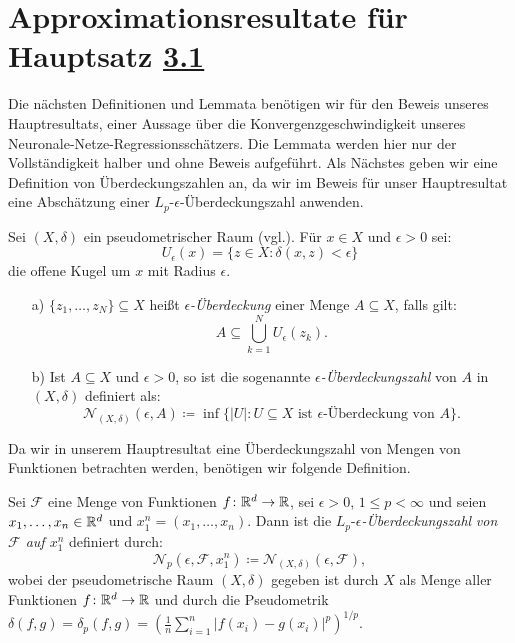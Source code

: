 \section{Approximationsresultate für Hauptsatz \hyperref[optstop]{3.1}}
Die nächsten  Definitionen und Lemmata benötigen wir für den Beweis unseres Hauptresultats, einer Aussage über die Konvergenzgeschwindigkeit unseres Neuronale-Netze-Regressionsschätzers. Die Lemmata werden hier nur der Vollständigkeit halber und ohne Beweis aufgeführt. 
Als Nächstes geben wir eine Definition von Überdeckungszahlen an, da wir im Beweis für unser Hauptresultat eine Abschätzung einer $L_p\text{-}\epsilon$-Überdeckungszahl anwenden.
\begin{defn}
\label{ueberdeckung}
Sei $(X, \delta)$ ein pseudometrischer Raum (vgl.\@ \cite[Definition~2.1.1]{Topologie2015}). Für $x \in X$ und $\epsilon > 0$ sei:
$$U_{\epsilon}(x) = \{z \in X : \delta(x, z) < \epsilon\}$$
die offene Kugel um $x$ mit Radius $\epsilon$.
\begin{itemize}
\item[a)] $\{z_1,\dots,z_N\} \subseteq X$ heißt $\epsilon$\textit{-Überdeckung} einer Menge $A \subseteq X$, falls gilt:
$$A \subseteq \bigcup_{k = 1}^N U_{\epsilon}(z_k).$$
\item[b)] Ist $A \subseteq X$ und $\epsilon > 0$, so ist die sogenannte $\epsilon$\textit{-Überdeckungszahl} von $A$ in $(X,\delta)$ definiert als:
$$\mathcal{N}_{(X,\delta)}(\epsilon, A) \coloneqq \inf\big\{|U| : U \subseteq X \text{ ist $\epsilon$-Überdeckung von } A\big\}.$$   
\end{itemize}
\end{defn}
Da wir in unserem Hauptresultat eine Überdeckungszahl von Mengen von Funktionen betrachten werden, benötigen wir folgende Definition.
\begin{defn}
\label{lpe}
Sei $\mathcal{F}$ eine Menge von Funktionen $f\colon \mathbb{R}^d \to \mathbb{R}$, sei $\epsilon > 0$, $1 \leq p < \infty$ und seien $x_1,\dots,x_n \in \mathbb{R}^d$ und $x_1^n = (x_1,\dots,x_n).$ Dann ist die $L_p$-$\epsilon$\textit{-Überdeckungszahl} \emph{von $\mathcal{F}$ auf $x_1^n$} definiert durch:
$$\mathcal{N}_p(\epsilon, \mathcal{F}, x_1^n) \coloneqq \mathcal{N}_{(X,\delta)}(\epsilon, \mathcal{F}),$$
wobei der pseudometrische Raum $(X, \delta)$ gegeben ist durch $X$ als Menge aller Funktionen $f\colon \mathbb{R}^d \to \mathbb{R}$ und durch die Pseudometrik $\delta(f, g) = \delta_p(f, g) = (\frac{1}{n}\sum_{i = 1}^n |f(x_i) - g(x_i)|^p)^{1/p}.$
\end{defn}
